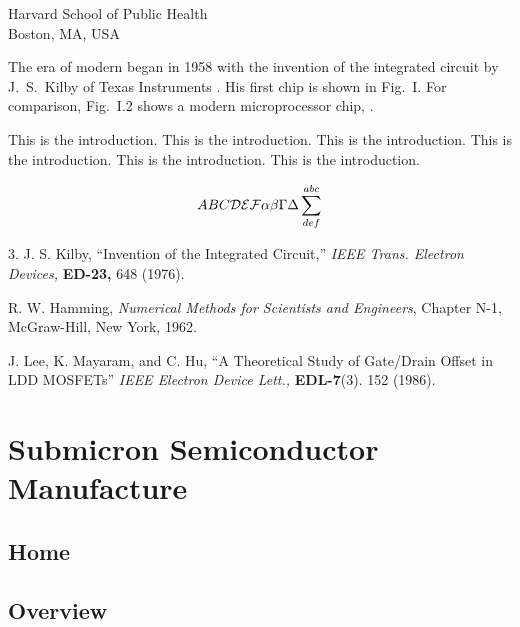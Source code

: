 \documentclass{wileySix}
\begin{document}
\begin{introduction}


{Harvard School of Public Health\\
Boston, MA, USA}

The era of modern  
began in 1958 with the invention of the
integrated circuit by J.~S.~Kilby
 of Texas Instruments \cite{kilby}.
His first chip is shown in Fig.~I. For comparison,
Fig.~I.2 shows a modern microprocessor chip, \cite{beren}.


This is the introduction.
This is the introduction.
This is the introduction.
This is the introduction.
This is the introduction.
This is the introduction.

\begin{equation}
ABC {\cal DEF} \alpha\beta\Gamma\Delta\sum^{abc}_{def}
\end{equation}


\begin{chapreferences}{3.}
J. S. Kilby,
``Invention of the Integrated Circuit,'' {\it IEEE Trans. Electron Devices,}
{\bf ED-23,} 648 (1976).

R. W. Hamming,
                 {\it Numerical Methods for Scientists and 
                 Engineers}, Chapter N-1, McGraw-Hill, 
                 New York, 1962.

J. Lee, K. Mayaram, and C. Hu, ``A Theoretical
               Study of Gate/Drain Offset in LDD MOSFETs''
                     {\it IEEE Electron Device Lett.,} {\bf EDL-7}(3). 152 
                     (1986).
\end{chapreferences}
\end{introduction}


\part[Submicron Semiconductor Manufacture]
{Submicron Semiconductor\\ Manufacture}

\chapter{Home}

\chapter{Overview}
\end{document}
